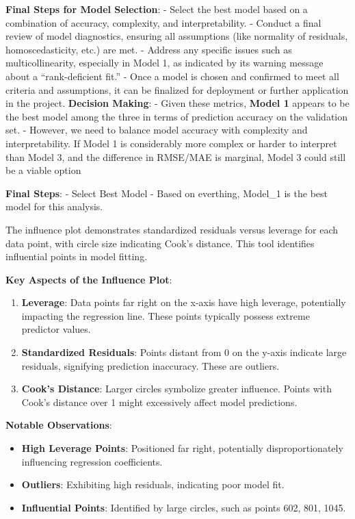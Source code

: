 \documentclass[
]{article}
\begin{document}
\textbf{Final Steps for Model Selection}: - Select the best model based
on a combination of accuracy, complexity, and interpretability. -
Conduct a final review of model diagnostics, ensuring all assumptions
(like normality of residuals, homoscedasticity, etc.) are met. - Address
any specific issues such as multicollinearity, especially in Model 1, as
indicated by its warning message about a ``rank-deficient fit.'' - Once
a model is chosen and confirmed to meet all criteria and assumptions, it
can be finalized for deployment or further application in the project.
\textbf{Decision Making}: - Given these metrics, \textbf{Model 1}
appears to be the best model among the three in terms of prediction
accuracy on the validation set. - However, we need to balance model
accuracy with complexity and interpretability. If Model 1 is
considerably more complex or harder to interpret than Model 3, and the
difference in RMSE/MAE is marginal, Model 3 could still be a viable
option

\textbf{Final Steps}: - Select Best Model - Based on everthing, Model\_1
is the best model for this analysis.

The influence plot demonstrates standardized residuals versus leverage
for each data point, with circle size indicating Cook's distance. This
tool identifies influential points in model fitting.

\textbf{Key Aspects of the Influence Plot}:

\begin{enumerate}
\def\labelenumi{\arabic{enumi}.}
\item
  \textbf{Leverage}: Data points far right on the x-axis have high
  leverage, potentially impacting the regression line. These points
  typically possess extreme predictor values.
\item
  \textbf{Standardized Residuals}: Points distant from 0 on the y-axis
  indicate large residuals, signifying prediction inaccuracy. These are
  outliers.
\item
  \textbf{Cook's Distance}: Larger circles symbolize greater influence.
  Points with Cook's distance over 1 might excessively affect model
  predictions.
\end{enumerate}

\textbf{Notable Observations}:

\begin{itemize}
\item
  \textbf{High Leverage Points}: Positioned far right, potentially
  disproportionately influencing regression coefficients.
\item
  \textbf{Outliers}: Exhibiting high residuals, indicating poor model
  fit.
\item
  \textbf{Influential Points}: Identified by large circles, such as
  points 602, 801, 1045.
\end{itemize}
\end{document}
